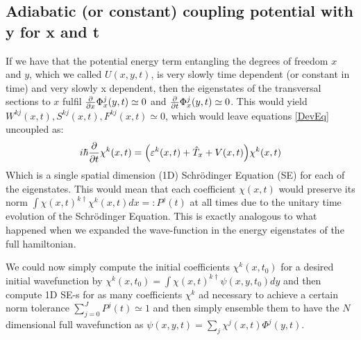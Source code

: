 \documentclass[11pt, a4paper]{article} %
\begin{document}
\subsection{Adiabatic (or constant) coupling potential with y for x and t}
If we have that the potential energy term entangling the degrees of freedom $x$ and $y$, which we called $U(x,y,t)$, is very slowly time dependent (or constant in time) and very slowly x dependent, then the eigenstates of the transversal sections to $x$ fulfil $\pdv{}{x}\Phi^j_x(y,t)\simeq 0$ and $\pdv{}{t}\Phi^j_x(y,t)\simeq 0$. This would yield $W^{kj}(x,t),S^{kj}(x,t),F^{kj}(x,t)\simeq 0$, which would leave equations \eqref{DevEq} uncoupled as:
\begin{equation}
i\hbar \pdv{}{t}\chi^k(x,t) = \qty( \varepsilon^k(x,t) + \hat{T}_x+V(x,t))\chi^k(x,t)
\end{equation}
Which is a single spatial dimension (1D) Schrödinger Equation (SE) for each of the eigenstates. This would mean that each coefficient $\chi(x,t)$ would preserve its norm $\int \chi(x,t)^{k\dagger}\chi^k(x,t) dx =: P^j(t)$ at all times due to the unitary time evolution of the Schrödinger Equation. This is exactly analogous to what happened when we expanded the wave-function in the energy eigenstates of the full hamiltonian.

We could now simply compute the initial coefficients $\chi^k(x,t_0)$ for a desired initial wavefunction by $\chi^k(x,t_0)=\int \chi(x,t)^{k\dagger} \psi(x,y,t_0)dy$ and then compute 1D SE-s for as many coefficients $\chi^k$ ad necessary to achieve a certain norm tolerance $\sum_{j=0}^J P^j(t) \simeq 1$ and then simply ensemble them to have the $N$ dimensional full wavefunction as $\psi(x,y,t)=\sum_j\chi^j(x,t)\Phi^j(y,t)$.
\end{document}

